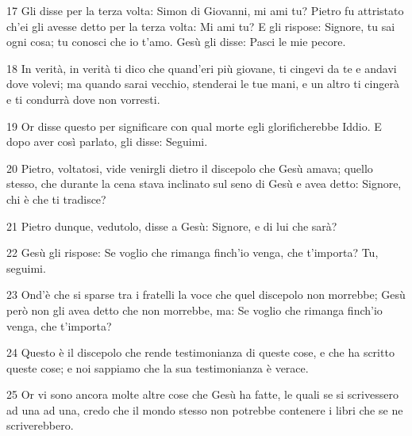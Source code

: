 \par 17 Gli disse per la terza volta: Simon di Giovanni, mi ami tu? Pietro fu attristato ch'ei gli avesse detto per la terza volta: Mi ami tu? E gli rispose: Signore, tu sai ogni cosa; tu conosci che io t'amo. Gesù gli disse: Pasci le mie pecore.
\par 18 In verità, in verità ti dico che quand'eri più giovane, ti cingevi da te e andavi dove volevi; ma quando sarai vecchio, stenderai le tue mani, e un altro ti cingerà e ti condurrà dove non vorresti.
\par 19 Or disse questo per significare con qual morte egli glorificherebbe Iddio. E dopo aver così parlato, gli disse: Seguimi.
\par 20 Pietro, voltatosi, vide venirgli dietro il discepolo che Gesù amava; quello stesso, che durante la cena stava inclinato sul seno di Gesù e avea detto: Signore, chi è che ti tradisce?
\par 21 Pietro dunque, vedutolo, disse a Gesù: Signore, e di lui che sarà?
\par 22 Gesù gli rispose: Se voglio che rimanga finch'io venga, che t'importa? Tu, seguimi.
\par 23 Ond'è che si sparse tra i fratelli la voce che quel discepolo non morrebbe; Gesù però non gli avea detto che non morrebbe, ma: Se voglio che rimanga finch'io venga, che t'importa?
\par 24 Questo è il discepolo che rende testimonianza di queste cose, e che ha scritto queste cose; e noi sappiamo che la sua testimonianza è verace.
\par 25 Or vi sono ancora molte altre cose che Gesù ha fatte, le quali se si scrivessero ad una ad una, credo che il mondo stesso non potrebbe contenere i libri che se ne scriverebbero.


